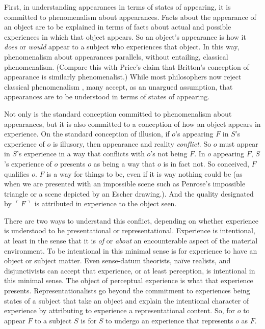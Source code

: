 \documentclass[12pt]{article}
\begin{document}
First, in understanding appearances in terms of states of appearing, it is committed to phenomenalism about appearances. Facts about the appearance of an object are to be explained in terms of facts about actual and possible experiences in which that object appears. So an object's appearance is how it \emph{does} or \emph{would} appear to a subject who experiences that object. In this way, phenomenalism about appearances parallels, without entailing, classical phenomenalism. (Compare this with Price's \citeyear{Price:1952ix} claim that Britton's \citeyear{Britton:1926zm} conception of appearance is similarly phenomenalist.) While most philosophers now reject classical phenomenalism \citep[though see][]{Foster:00ny}, many accept, as an unargued assumption, that appearances are to be understood in terms of states of appearing.

Not only is the standard conception committed to phenomenalism about appearances, but it is also committed to a conception of how an object appears in experience. On the standard conception of illusion, if \( o \)'s appearing \( F \) in \( S \)'s experience of \( o \) is illusory, then appearance and reality \emph{conflict}. So \( o \) must appear in \( S \)'s experience in a way that conflicts with \( o \)'s not being \( F \). In \( o \) appearing \( F \), \( S \)'s experience of \( o \) presents \( o \) as being a way that \( o \) is in fact not. So conceived, \( F \) qualifies \( o \). \( F \) is a way for things to be, even if it is way nothing could be (as when we are presented with an impossible scene such as Penrose's \citeyear{Penrose:1958kx} impossible triangle or a scene depicted by an Escher drawing.). And the quality designated by \( \ulcorner F \urcorner \) is attributed in experience to the object seen.

There are two ways to understand this conflict, depending on whether experience is understood to be presentational or representational. Experience is intentional, at least in the sense that it is \emph{of} or \emph{about} an encounterable aspect of the material environment. To be intentional in this minimal sense is for experience to have an object or subject matter. Even sense-datum theorists, naïve realists, and disjunctivists can accept that experience, or at least perception, is intentional in this minimal sense. The object of perceptual experience is what that experience presents. Representationalists go beyond the commitment to experiences being states of a subject that take an object and explain the intentional character of experience by attributing to experience a representational content. So, for \( o \) to appear \( F \) to a subject \( S \) is for \( S \) to undergo an experience that represents \( o \) as \( F \). 
\end{document}
